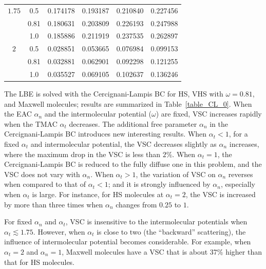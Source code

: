 \begin{table}[t]
\begin{tabular}{cccccc}
		$1.75$
		& 0.5	& 0.174178   & 0.193187   & 0.210840   & 0.227456\\
		&0.81	& 0.180631   & 0.203809   & 0.226193  & 0.247988 \\
		&1.0	& 0.185886   & 0.211919   & 0.237535 &  0.262897  \\
		
		$2$
		& 0.5	& 0.028851   & 0.053665   &0.076984 & 0.099153\\
		&0.81	& 0.032881   & 0.062901   &0.092298  & 0.121255 \\
		&1.0	& 0.035527   & 0.069105   &0.102637 &  0.136246  \\
		\hline
	\end{tabular}\par
	
\end{table}

The LBE is solved with the Cercignani-Lampis BC for HS, VHS with $\omega=0.81$, and Maxwell molecules; results are summarized in Table~\ref{table_CL_0}. When the EAC $\alpha_n$ and the intermolecular potential ($\omega$) are fixed, VSC increases rapidly when  the TMAC $\alpha_t$ decreases. The additional free parameter $\alpha_n$ in the Cercignani-Lampis BC introduces new interesting results. When $\alpha_t<1$, for a fixed $\alpha_t$ and intermolecular potential, the VSC decreases slightly as $\alpha_n$ increases, where the maximum drop in the VSC is less than $2\%$. When $\alpha_t=1$, the Cercignani-Lampis BC is reduced to the fully diffuse one in this problem, and the VSC does not vary with $\alpha_n$. When $\alpha_t>1$, the variation of VSC on $\alpha_n$ reverses when compared to that of $\alpha_t<1$; and it is strongly influenced by $\alpha_n$, especially when $\alpha_t$ is large. For instance, for HS molecules at $\alpha_t=2$, the VSC is increased by more than three times when $\alpha_n$ changes from $0.25$ to $1$. 

For fixed $\alpha_n$ and $\alpha_t$, VSC is insensitive to the intermolecular potentials when $\alpha_t\lesssim1.75$. However, when $\alpha_t$ is close to two (the ``backward'' scattering), the influence of intermolecular potential becomes considerable. For example, when $\alpha_t=2$ and $\alpha_n=1$, Maxwell molecules have a VSC that is about 37\% higher than that for HS molecules.





